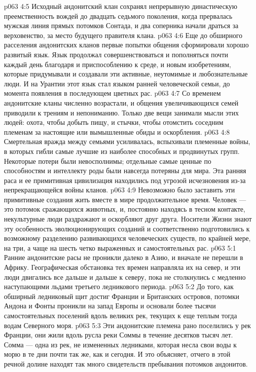 \vs p063 4:5 \pc Исходный андонитский клан сохранял непрерывную династическую преемственность вождей до двадцать седьмого поколения, когда прервалась мужская линия прямых потомков Сонтада, и два соперника начали драться за верховенство, за место будущего правителя клана.
\vs p063 4:6 Еще до обширного расселения андонитских кланов первые попытки общения сформировали хорошо развитый язык. Язык продолжал совершенствоваться и пополняться почти каждый день благодаря и приспособлению к среде, и новым изобретениям, которые придумывали и создавали эти активные, неутомимые и любознательные люди. И на Урантии этот язык стал языком ранней человеческой семьи, до момента появления в последующем цветных рас.
\vs p063 4:7 \pc Со временем андонитские кланы численно возрастали, и общения увеличивающихся семей приводили к трениям и непониманию. Только две вещи занимали мысли этих людей: охота, чтобы добыть пищу, и стычки, чтобы отомстить соседним племенам за настоящие или вымышленные обиды и оскорбления.
\vs p063 4:8 Смертельная вражда между семьями усиливалась, вспыхивали племенные войны, в которых гибли самые лучшие из наиболее способных и продвинутых групп. Некоторые потери были невосполнимы; отдельные самые ценные по способностям и интеллекту роды были навсегда потеряны для мира. Эта ранняя раса и ее примитивная цивилизация находились под угрозой исчезновения из\hyp{}за непрекращающейся войны кланов.
\vs p063 4:9 Невозможно было заставить эти примитивные создания жить вместе в мире продолжительное время. Человек --- это потомок сражающихся животных, и, постоянно находясь в тесном контакте, некультурные люди раздражают и оскорбляют друг друга. Носители Жизни знают эту особенность эволюционирующих созданий и соответственно подготовились к возможному разделению развивающихся человеческих существ, по крайней мере, на три, а чаще на шесть четко выраженных и самостоятельных рас.
\vs p063 5:1 Ранние андонитские расы не проникли далеко в Азию, и вначале не перешли в Африку. Географическая обстановка тех времен направляла их на север, и эти люди двигались все дальше и дальше к северу, пока не столкнулись с медленно наступающими льдами третьего ледникового периода.
\vs p063 5:2 До того, как обширный ледниковый щит достиг Франции и Британских островов, потомки Андона и Фонты проникли на запад Европы и основали более тысячи самостоятельных поселений вдоль великих рек, текущих к еще теплым тогда водам Северного моря.
\vs p063 5:3 Эти андонитские племена рано поселились у рек Франции, они жили вдоль русла реки Соммы в течение десятков тысяч лет. Сомма --- одна из рек, не измененных ледниками, которая несла свои воды к морю в те дни почти так же, как и сегодня. И это объясняет, отчего в этой речной долине находят так много свидетельств пребывания потомков андонитов.
